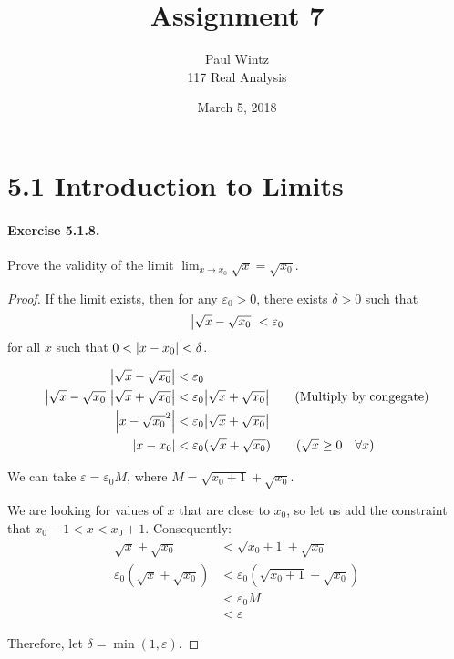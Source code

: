 \documentclass[11pt]{article}
\title{Assignment 7}
\author{Paul Wintz\\117 Real Analysis}
\date{March 5, 2018}
\DeclarePairedDelimiter{\abs}{\lvert}{\rvert}
\def \epsilon {\varepsilon}
\begin{document}
\maketitle


\def \L {\sqrt{x_0}}
\def \M {\sqrt{x_0 + 1} + \L}
\section*{5.1 \textsl{}Introduction to Limits}
\paragraph{Exercise 5.1.8.} Prove the validity of the limit $\lim_{x \rightarrow x_0} \sqrt{x} = \L$.

\begin{proof}

If the limit exists, then for any $\epsilon_0 > 0$, there exists $\delta > 0$ such that 
	$$ \abs*{\sqrt{x} - \L} < \epsilon_0 $$ 
for all $x$ such that $ 0 < \abs*{x - x_0} < \delta$.

\begin{align*}
	\abs*{\sqrt{x} - \L} &< \epsilon_0 \\
	\abs*{\sqrt{x} - \L}\abs*{\sqrt{x} + \L} &< \epsilon_0 \abs*{\sqrt{x} + \L} \tag{Multiply by congegate}  \\
	\abs*{x - \L^2} &< \epsilon_0 \abs*{\sqrt{x} + \L} \\
	\abs*{x - x_0} &< \epsilon_0 (\sqrt{x} + \L) \tag{$ \sqrt{x} \geq 0 \quad \forall x $}
\end{align*}

We can take $ \epsilon = \epsilon_0 M$, where $M = \M$. 

We are looking for values of $x$ that are close to $x_0$, so let us add the constraint that $x_0 - 1 < x < x_0 + 1$. Consequently:
\begin{align*}
\sqrt{x} + \L &< \M \\
\epsilon_0 (\sqrt{x} + \L)& < \epsilon_0 (\M) \\
&< \epsilon_0 M \\
&< \epsilon
\end{align*}

Therefore, let $\delta = \min(1, \epsilon)$. 

\end{proof}
\end{document}
